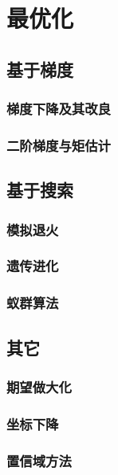 \chapter{最优化}

\section{基于梯度}
\subsection{梯度下降及其改良} %
\label{sub:梯度下降及其改良}

\subsection{二阶梯度与矩估计} %
\label{sub:二阶梯度与矩估计}


\section{基于搜索}
\subsection{模拟退火} %
\label{sub:模拟退火}

\subsection{遗传进化} %
\label{sub:遗传进化}

\subsection{蚁群算法} %
\label{sub:蚁群算法}



\section{其它} %
\label{sec:其它}
\subsection{期望做大化} %
\label{sub:期望做大化}

\subsection{坐标下降} %
\label{sub:坐标下降}

\subsection{置信域方法} %
\label{sub:置信域方法}


